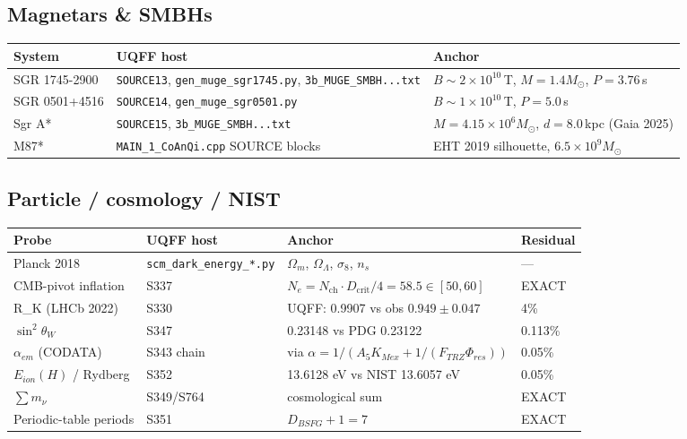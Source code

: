 \documentclass[11pt]{article}
\begin{document}
\subsection{Magnetars \& SMBHs}
\begin{longtable}{p{3cm}p{6.5cm}p{5cm}}
\toprule
System & UQFF host & Anchor \\
\midrule \endhead
SGR 1745-2900 & \texttt{SOURCE13}, \texttt{gen\_muge\_sgr1745.py}, \texttt{3b\_MUGE\_SMBH...txt} & $B \sim 2\times10^{10}$\,T, $M = 1.4 M_\odot$, $P = 3.76$\,s \\
SGR 0501+4516 & \texttt{SOURCE14}, \texttt{gen\_muge\_sgr0501.py} & $B \sim 1\times10^{10}$\,T, $P = 5.0$\,s \\
Sgr A* & \texttt{SOURCE15}, \texttt{3b\_MUGE\_SMBH...txt} & $M = 4.15\times10^{6} M_\odot$, $d = 8.0$\,kpc (Gaia 2025) \\
M87* & \texttt{MAIN\_1\_CoAnQi.cpp} SOURCE blocks & EHT 2019 silhouette, $6.5\times10^{9} M_\odot$ \\
\bottomrule
\end{longtable}

\subsection{Particle / cosmology / NIST}
\begin{longtable}{p{4cm}p{4cm}p{5cm}p{2cm}}
\toprule
Probe & UQFF host & Anchor & Residual \\
\midrule \endhead
Planck 2018 & \texttt{scm\_dark\_energy\_*.py} & $\Omega_m$, $\Omega_\Lambda$, $\sigma_8$, $n_s$ & --- \\
CMB-pivot inflation & S337 & $N_e = N_{\mathrm{ch}}\cdot D_{\mathrm{crit}}/4 = 58.5 \in [50,60]$ & EXACT \\
R\_K (LHCb 2022) & S330 & UQFF: 0.9907 vs obs $0.949 \pm 0.047$ & 4\% \\
$\sin^2\theta_W$ & S347 & 0.23148 vs PDG 0.23122 & 0.113\% \\
$\alpha_{em}$ (CODATA) & S343 chain & via $\alpha = 1/(A_5 K_{Mex} + 1/(F_{TRZ}\Phi_{res}))$ & 0.05\% \\
$E_{ion}(H)$ / Rydberg & S352 & 13.6128 eV vs NIST 13.6057 eV & 0.05\% \\
$\sum m_\nu$ & S349/S764 & cosmological sum & EXACT \\
Periodic-table periods & S351 & $D_{BSFG} + 1 = 7$ & EXACT \\
\bottomrule
\end{longtable}
\end{document}
